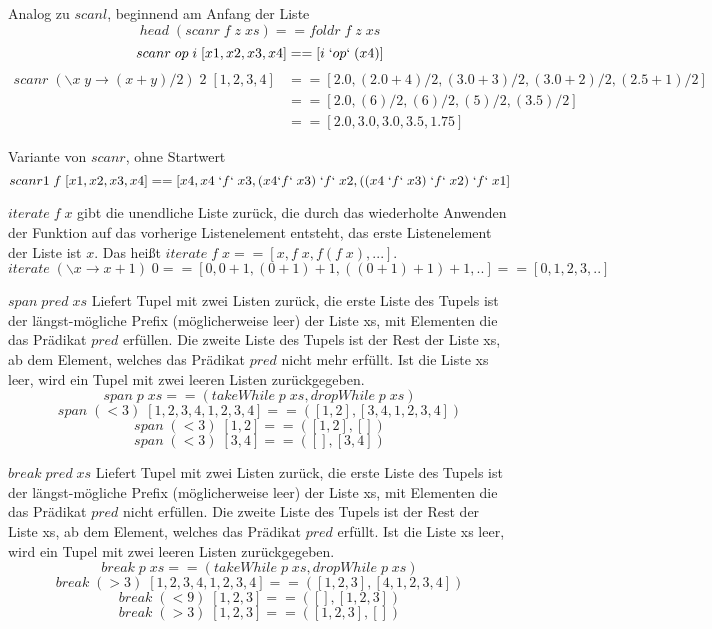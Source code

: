 Analog zu $scanl$, beginnend am Anfang der Liste
\equal
$$head\; (scanr\; f\; z\; xs) == foldr\; f\; z\; xs$$
\example
$$scanr\; op\; i\; [x1,x2,x3,x4] == [i\; `op`\; (x4)]$$
\begin{align*} 
scanr\; (\backslash x\; y \rightarrow (x+y)/2)\; 2\; [1,2,3,4] 
&== [2.0, (2.0+4)/2, (3.0+3)/2, (3.0+2)/2, (2.5+1)/2] \\
&== [2.0, (6)/2, (6)/2, (5)/2, (3.5)/2]\\
&== [2.0,3.0,3.0,3.5,1.75]
\end{align*}

Variante von $scanr$, ohne Startwert
\example
$$scanr1\; f\; [x1,x2,x3,x4] == [x4, x4\; `f`\; x3, (x4 `f`\; x3)\; `f`\; x2, ((x4\; `f`\; x3)\; `f`\; x2)\; `f`\; x1]$$

$iterate\; f\; x$ gibt die unendliche Liste zurück, die durch das wiederholte Anwenden der Funktion auf das vorherige Listenelement entsteht, das erste Listenelement der Liste ist $x$.
Das heißt $iterate\; f\; x == [x, f\; x, f (f\; x), ...]$.
\example
$$iterate\; (\backslash x \rightarrow x+1)\; 0 == [0, 0+1, (0+1)+1, ((0+1)+1)+1,..] == [0, 1, 2, 3, ..]$$

$span\; pred\; xs$ Liefert Tupel mit zwei Listen zurück, die erste Liste des Tupels ist der längst-mögliche Prefix (möglicherweise leer) der Liste xs, mit Elementen die das Prädikat $pred$ erfüllen. Die zweite Liste des Tupels ist der Rest der Liste xs, ab dem Element, welches das Prädikat $pred$ nicht mehr erfüllt. Ist die Liste xs leer, wird ein Tupel mit zwei leeren Listen zurückgegeben.
\equal
$$span\; p\; xs == (takeWhile\; p\; xs, dropWhile\; p\; xs)$$
\example
$$span\; (<3)\; [1,2,3,4,1,2,3,4]==([1,2],[3,4,1,2,3,4])$$
$$span\; (<3)\; [1,2] == ([1,2], [])$$
$$span\; (<3)\; [3,4] == ([], [3,4])$$

$break\; pred\; xs$ Liefert Tupel mit zwei Listen zurück, die erste Liste des Tupels ist der längst-mögliche Prefix (möglicherweise leer) der Liste xs, mit Elementen die das Prädikat $pred$ nicht erfüllen. Die zweite Liste des Tupels ist der Rest der Liste xs, ab dem Element, welches das Prädikat $pred$ erfüllt. Ist die Liste xs leer, wird ein Tupel mit zwei leeren Listen zurückgegeben.
\equal
$$break\; p\; xs == (takeWhile\; p\; xs, dropWhile\; p\; xs)$$
\example
$$break\; (>3)\; [1,2,3,4,1,2,3,4]==([1,2,3],[4,1,2,3,4])$$
$$break\; (<9)\; [1,2,3] == ([], [1,2,3])$$
$$break\; (>3)\; [1,2,3] == ([1,2,3], [])$$


